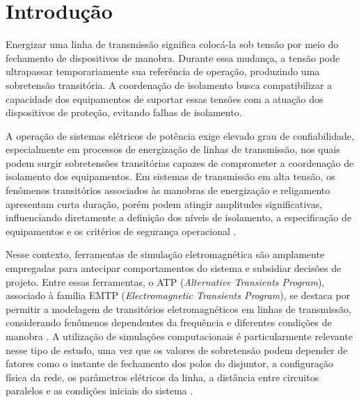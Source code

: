 \documentclass[
	12pt,				%
	openright,			%
	oneside,			%
	a4paper,			%
	chapter=TITLE,		%
	section=TITLE,		%
	subsection=TITLE,	%
	subsubsection=TITLE,%
	english,			%
	brazilian			%
	]{abntex2}
\theoremstyle{definition}
\begin{document}
\tableofcontents*
\cleardoublepage



\hypersetup{pageanchor=true}
\textual
\pagestyle{simple}

\chapter{Introdução}

Energizar uma linha de transmissão significa colocá-la sob tensão por meio
do fechamento de dispositivos de manobra. Durante essa mudança, a tensão
pode ultrapassar temporariamente sua referência de operação, produzindo
uma sobretensão transitória. A coordenação de isolamento busca compatibilizar
a capacidade dos equipamentos de suportar essas tensões com a atuação dos
dispositivos de proteção, evitando falhas de isolamento.

A operação de sistemas elétricos de potência exige elevado grau de confiabilidade, especialmente em processos de energização de linhas de transmissão, nos quais podem surgir sobretensões transitórias capazes de comprometer a coordenação de isolamento dos equipamentos. 
Em sistemas de transmissão em alta tensão, os fenômenos transitórios associados às manobras de energização e religamento apresentam curta duração, porém podem atingir amplitudes significativas, influenciando diretamente a definição dos níveis de isolamento, a especificação de equipamentos e os critérios de segurança operacional \cite{iec6007112019,iec6007122023,marin2025}.

Nesse contexto, ferramentas de simulação eletromagnética são amplamente empregadas para antecipar comportamentos do sistema e subsidiar decisões de projeto. Entre essas ferramentas, o ATP (\textit{Alternative Transients Program}), associado à família EMTP (\textit{Electromagnetic Transients Program}), se destaca por permitir a modelagem de transitórios eletromagnéticos em linhas de transmissão, considerando fenômenos dependentes da frequência e diferentes condições de manobra \cite{dommel1969,marti1982}.
A utilização de simulações computacionais é particularmente relevante nesse tipo de estudo, uma vez que os valores de sobretensão podem depender de fatores como o instante de fechamento dos polos do disjuntor, a configuração física da rede, os parâmetros elétricos da linha, a distância entre circuitos paralelos e as condições iniciais do sistema \cite{mestas2010,marin2025}.
\end{document}
